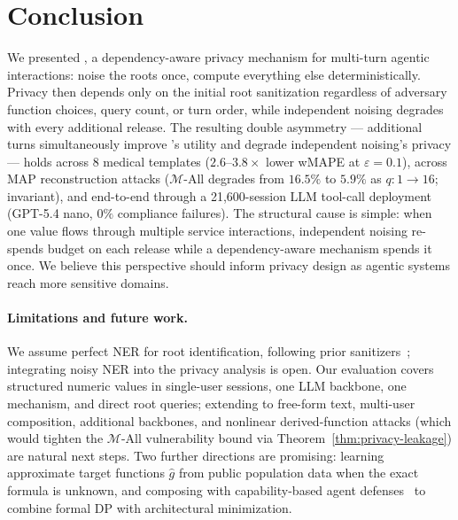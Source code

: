 \section{Conclusion}
\label{sec:conclusion}
We presented \sysname{}, a dependency-aware privacy mechanism for multi-turn agentic interactions: noise the roots once, compute everything else deterministically. Privacy then depends only on the initial root sanitization regardless of adversary function choices, query count, or turn order, while independent noising degrades with every additional release. The resulting double asymmetry --- additional turns simultaneously improve \sysname{}'s utility and degrade independent noising's privacy --- holds across 8 medical templates ($2.6$--$3.8\times$ lower wMAPE at $\varepsilon = 0.1$), across MAP reconstruction attacks ($\mathcal{M}$-All degrades from $16.5\%$ to $5.9\%$ as $q{:}1{\to}16$; \sysname{} invariant), and end-to-end through a 21{,}600-session LLM tool-call deployment (GPT-5.4 nano, $0\%$ compliance failures). The structural cause is simple: when one value flows through multiple service interactions, independent noising re-spends budget on each release while a dependency-aware mechanism spends it once. We believe this perspective should inform privacy design as agentic systems reach more sensitive domains.

\paragraph{Limitations and future work.}
We assume perfect NER for root identification, following prior sanitizers~\cite{chowdhury2025,wu2025capecontextawarepromptperturbation}; integrating noisy NER into the privacy analysis is open. Our evaluation covers structured numeric values in single-user sessions, one LLM backbone, one mechanism, and direct root queries; extending to free-form text, multi-user composition, additional backbones, and nonlinear derived-function attacks (which would tighten the $\mathcal{M}$-All vulnerability bound via Theorem~\ref{thm:privacy-leakage}) are natural next steps. Two further directions are promising: learning approximate target functions $\hat{g}$ from public population data when the exact formula is unknown, and composing \sysname{} with capability-based agent defenses~\cite{bagdasarian2024airgapagent,debenedetti2025camel} to combine formal DP with architectural minimization.